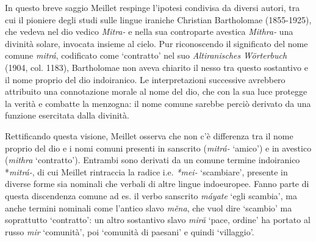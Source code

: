 \documentclass[output=paper]{langsci/langscibook}
\begin{document}
In questo breve saggio Meillet respinge l’ipotesi condivisa da diversi autori, tra cui il pioniere degli studi sulle lingue iraniche Christian Bartholomae (1855-1925), che vedeva nel dio vedico \textit{Mitra-} e nella sua controparte avestica \textit{Mithra-} una divinità solare, invocata insieme al cielo.\textbf{ }Pur riconoscendo il significato del nome comune \textit{mitrá}, codificato come ‘contratto’ nel suo \textit{Altiranisches} \textit{Wörterbuch} (1904, col. 1183), Bartholomae non aveva chiarito il nesso tra questo sostantivo e il nome proprio del dio indoiranico. Le interpretazioni successive avrebbero attribuito una connotazione morale al nome del dio, che con la sua luce protegge la verità e combatte la menzogna: il nome comune sarebbe perciò derivato da una funzione esercitata dalla divinità.\footnotemark{}

Rettificando questa visione, Meillet osserva che non c’è differenza tra il nome proprio del dio e i nomi comuni presenti in sanscrito (\textit{mitrá{}-} ‘amico’) e in avestico (\textit{mithra} ‘contratto’). Entrambi sono derivati da un comune termine indoiranico *\textit{mitrá-}, di cui Meillet rintraccia la radice i.e. \textit{*mei-} ‘scambiare’, presente in diverse forme sia nominali che verbali di altre lingue indoeuropee.\footnotemark{} Fanno parte di questa discendenza comune ad es. il verbo sanscrito \textit{máyate} ‘egli scambia’, ma anche termini nominali come l’antico slavo \textit{měna}, che vuol dire ‘scambio’ ma soprattutto ‘contratto’: un altro sostantivo slavo \textit{miră} ‘pace, ordine’ ha portato al russo \textit{mir} ‘comunità’, poi ‘comunità di paesani’ e quindi ‘villaggio’.

\end{document}
